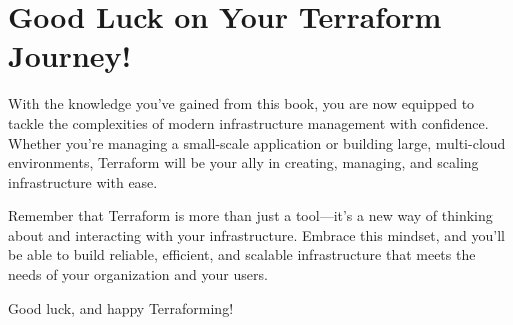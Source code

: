 \section{Good Luck on Your Terraform Journey!}

With the knowledge you've gained from this book, you are now equipped to tackle the complexities of modern infrastructure management with confidence. Whether you're managing a small-scale application or building large, multi-cloud environments, Terraform will be your ally in creating, managing, and scaling infrastructure with ease.

Remember that Terraform is more than just a tool—it's a new way of thinking about and interacting with your infrastructure. Embrace this mindset, and you'll be able to build reliable, efficient, and scalable infrastructure that meets the needs of your organization and your users.

Good luck, and happy Terraforming!
